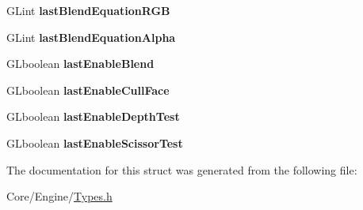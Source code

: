 \begin{DoxyCompactItemize}
\item 
\hypertarget{structDCEngine_1_1OpenGLStateData_a5bf1cfa29ea5fa6d9dbfdaffc5241cd4}{G\-Lint {\bfseries last\-Blend\-Equation\-R\-G\-B}}\label{structDCEngine_1_1OpenGLStateData_a5bf1cfa29ea5fa6d9dbfdaffc5241cd4}

\item 
\hypertarget{structDCEngine_1_1OpenGLStateData_ad7163465b88e6f57b28a903525641a9c}{G\-Lint {\bfseries last\-Blend\-Equation\-Alpha}}\label{structDCEngine_1_1OpenGLStateData_ad7163465b88e6f57b28a903525641a9c}

\item 
\hypertarget{structDCEngine_1_1OpenGLStateData_a988c0af2bc4edd969cc1a7e65773162f}{G\-Lboolean {\bfseries last\-Enable\-Blend}}\label{structDCEngine_1_1OpenGLStateData_a988c0af2bc4edd969cc1a7e65773162f}

\item 
\hypertarget{structDCEngine_1_1OpenGLStateData_a9c06c3f1c5d87f215b2a7b136ecc3575}{G\-Lboolean {\bfseries last\-Enable\-Cull\-Face}}\label{structDCEngine_1_1OpenGLStateData_a9c06c3f1c5d87f215b2a7b136ecc3575}

\item 
\hypertarget{structDCEngine_1_1OpenGLStateData_abb1d8ebd4d0d3e4b01342c38429cbb7f}{G\-Lboolean {\bfseries last\-Enable\-Depth\-Test}}\label{structDCEngine_1_1OpenGLStateData_abb1d8ebd4d0d3e4b01342c38429cbb7f}

\item 
\hypertarget{structDCEngine_1_1OpenGLStateData_a3a4dc1bac7777705dd26a9723cf3dca3}{G\-Lboolean {\bfseries last\-Enable\-Scissor\-Test}}\label{structDCEngine_1_1OpenGLStateData_a3a4dc1bac7777705dd26a9723cf3dca3}

\end{DoxyCompactItemize}


The documentation for this struct was generated from the following file\-:\begin{DoxyCompactItemize}
\item 
Core/\-Engine/\hyperlink{Types_8h}{Types.\-h}\end{DoxyCompactItemize}
